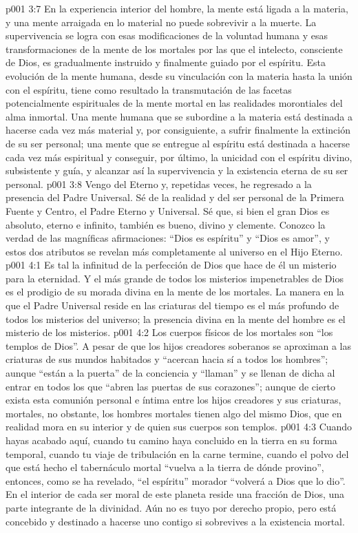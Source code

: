 \vs p001 3:7 \pc En la experiencia interior del hombre, la mente está ligada a la materia, y una mente arraigada en lo material no puede sobrevivir a la muerte. La supervivencia se logra con esas modificaciones de la voluntad humana y esas transformaciones de la mente de los mortales por las que el intelecto, consciente de Dios, es gradualmente instruido y finalmente guiado por el espíritu. Esta evolución de la mente humana, desde su vinculación con la materia hasta la unión con el espíritu, tiene como resultado la transmutación de las facetas potencialmente espirituales de la mente mortal en las realidades morontiales del alma inmortal. Una mente humana que se subordine a la materia está destinada a hacerse cada vez más material y, por consiguiente, a sufrir finalmente la extinción de su ser personal; una mente que se entregue al espíritu está destinada a hacerse cada vez más espiritual y conseguir, por último, la unicidad con el espíritu divino, subsistente y guía, y alcanzar así la supervivencia y la existencia eterna de su ser personal.
\vs p001 3:8 Vengo del Eterno y, repetidas veces, he regresado a la presencia del Padre Universal. Sé de la realidad y del ser personal de la Primera Fuente y Centro, el Padre Eterno y Universal. Sé que, si bien el gran Dios es absoluto, eterno e infinito, también es bueno, divino y clemente. Conozco la verdad de las magníficas afirmaciones: “Dios es espíritu” y “Dios es amor”, y estos dos atributos se revelan más completamente al universo en el Hijo Eterno.
\vs p001 4:1 Es tal la infinitud de la perfección de Dios que hace de él un misterio para la eternidad. Y el más grande de todos los misterios impenetrables de Dios es el prodigio de su morada divina en la mente de los mortales. La manera en la que el Padre Universal reside en las criaturas del tiempo es el más profundo de todos los misterios del universo; la presencia divina en la mente del hombre es el misterio de los misterios.
\vs p001 4:2 Los cuerpos físicos de los mortales son “los templos de Dios”. A pesar de que los hijos creadores soberanos se aproximan a las criaturas de sus mundos habitados y “acercan hacia sí a todos los hombres”; aunque “están a la puerta” de la conciencia y “llaman” y se llenan de dicha al entrar en todos los que “abren las puertas de sus corazones”; aunque de cierto exista esta comunión personal e íntima entre los hijos creadores y sus criaturas, mortales, no obstante, los hombres mortales tienen algo del mismo Dios, que en realidad mora en su interior y de quien sus cuerpos son templos.
\vs p001 4:3 Cuando hayas acabado aquí, cuando tu camino haya concluido en la tierra en su forma temporal, cuando tu viaje de tribulación en la carne termine, cuando el polvo del que está hecho el tabernáculo mortal “vuelva a la tierra de dónde provino”, entonces, como se ha revelado, “el espíritu” morador “volverá a Dios que lo dio”. En el interior de cada ser moral de este planeta reside una fracción de Dios, una parte integrante de la divinidad. Aún no es tuyo por derecho propio, pero está concebido y destinado a hacerse uno contigo si sobrevives a la existencia mortal.
